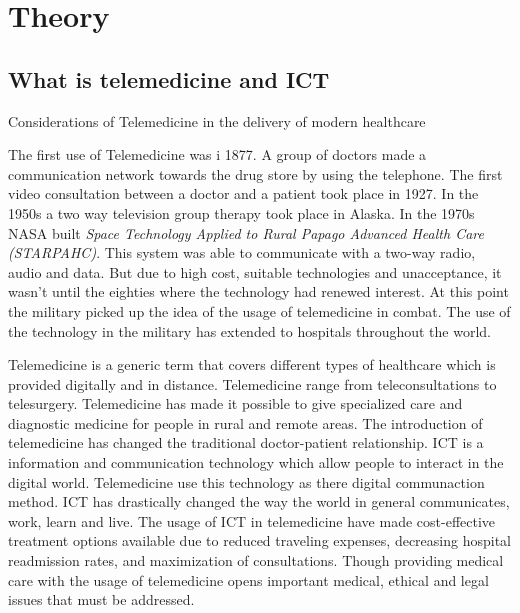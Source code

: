 \chapter{Theory}


\section{What is telemedicine and ICT}

Considerations of Telemedicine in the delivery of modern healthcare



The first use of Telemedicine was i 1877. A group of doctors made a communication network towards the drug store by using the telephone. The first video consultation between a doctor and a patient took place in 1927. In the 1950s a two way television group therapy took place in Alaska. In the 1970s NASA built \textit{Space Technology Applied to Rural Papago Advanced Health Care (STARPAHC)}. This system was able to communicate with a two-way radio, audio and data. But due to high cost, suitable technologies and unacceptance, it wasn't until the eighties where the technology had renewed interest. At this point the military picked up the idea of the usage of telemedicine in combat. The use of the technology in the military has extended to hospitals throughout the world. 


Telemedicine is a generic term that covers different types of healthcare which is provided digitally and in distance. Telemedicine range from teleconsultations to telesurgery. Telemedicine has made it possible to give specialized care and diagnostic medicine for people in rural and remote areas. The introduction of telemedicine has changed the traditional doctor-patient relationship. 
ICT is a information and communication technology which allow people to interact in the digital world. Telemedicine use this technology as there digital communaction method. ICT has drastically changed the way the world in general communicates, work, learn and live.   
The usage of ICT in telemedicine have made cost-effective treatment options available due to reduced traveling expenses, decreasing hospital readmission rates, and maximization of consultations. Though providing medical care with the usage of telemedicine opens important medical, ethical and legal issues that must be addressed\cite{considerations}.



